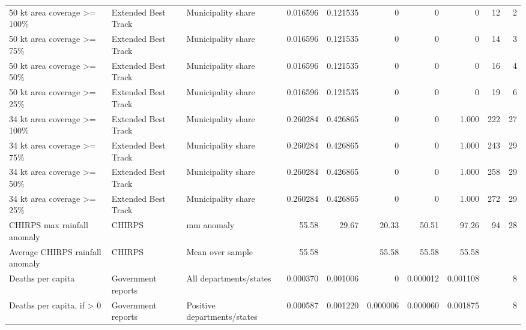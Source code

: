 \begin{minipage}{\linewidth}
{\begin{tabular}{lllrrrrrrr}
50 kt area coverage >= 100\% & Extended Best Track & Municipality share & 0.016596 & 0.121535 & 0 & 0 & 0 & 12 & 2 \\
50 kt area coverage >= 75\% & Extended Best Track & Municipality share & 0.016596 & 0.121535 & 0 & 0 & 0 & 14 & 3 \\
50 kt area coverage >= 50\% & Extended Best Track & Municipality share & 0.016596 & 0.121535 & 0 & 0 & 0 & 16 & 4 \\
50 kt area coverage >= 25\% & Extended Best Track & Municipality share & 0.016596 & 0.121535 & 0 & 0 & 0 & 19 & 6 \\
34 kt area coverage >= 100\% & Extended Best Track & Municipality share & 0.260284 & 0.426865 & 0 & 0 & 1.000 & 222 & 27 \\
34 kt area coverage >= 75\% & Extended Best Track & Municipality share & 0.260284 & 0.426865 & 0 & 0 & 1.000 & 243 & 29 \\
34 kt area coverage >= 50\% & Extended Best Track & Municipality share & 0.260284 & 0.426865 & 0 & 0 & 1.000 & 258 & 29 \\
34 kt area coverage >= 25\% & Extended Best Track & Municipality share & 0.260284 & 0.426865 & 0 & 0 & 1.000 & 272 & 29 \\
CHIRPS max rainfall anomaly & CHIRPS & mm anomaly & 55.58 & 29.67 & 20.33 & 50.51 & 97.26 & 94 & 28 \\
Average CHIRPS rainfall anomaly & CHIRPS & Mean over sample & 55.58 &  & 55.58 & 55.58 & 55.58 &  &  \\
Deaths per capita & Government reports & All departments/states & 0.000370 & 0.001006 & 0 & 0.000012 & 0.001108 &  & 8 \\
Deaths per capita, if > 0 & Government reports & Positive departments/states & 0.000587 & 0.001220 & 0.000006 & 0.000060 & 0.001875 &  & 8 \\
\bottomrule
\end{tabular}
}
\end{minipage}
